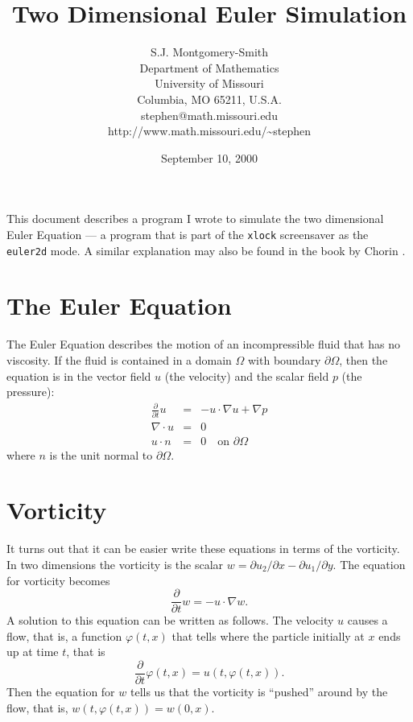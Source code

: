 \documentclass[12pt]{article}
\begin{document}
\title{Two Dimensional Euler Simulation}

\author{
S.J. Montgomery-Smith\\
Department of Mathematics\\
University of Missouri\\
Columbia, MO 65211, U.S.A.\\
stephen@math.missouri.edu\\
http://www.math.missouri.edu/\~{}stephen}

\date{September 10, 2000}

\maketitle

This document describes a program I wrote to simulate the
two dimensional Euler Equation --- a program that is part
of the {\tt xlock} screensaver as the {\tt euler2d}
mode.  A similar explanation may also be found in the
book by Chorin \cite{C}.

\section{The Euler Equation}

The Euler Equation describes the motion of an incompressible
fluid that has no viscosity.  If the fluid is contained
in a domain $\Omega$ with boundary $\partial \Omega$, then
the equation is in the vector field $u$ (the velocity)
and the
scalar field $p$ (the pressure):
\begin{eqnarray*}
\frac{\partial}{\partial t} u &=& -u \cdot \nabla u + \nabla p \\
\nabla \cdot u &=& 0 \\
u \cdot n &=& 0 \quad \text{on $\partial \Omega$}
\end{eqnarray*}
where $n$ is the unit normal to $\partial \Omega$.

\section{Vorticity}

It turns out that it can be easier write these equations
in terms of the vorticity.  In two dimensions the vorticity
is the scalar $w = \partial u_2/\partial x - \partial u_1/\partial y$.
The equation for vorticity becomes
\[ \frac{\partial}{\partial t} w = -u \cdot \nabla w .\]
A solution to this equation can be written as follows.  The velocity
$u$ causes a flow, that is, a function $\varphi(t,x)$ that tells where
the particle initially at $x$ ends up at time $t$, that is
\[
\frac\partial{\partial t} \varphi(t,x)
= u(t,\varphi(t,x)) .\]
Then the equation
for $w$ tells us that the vorticity is ``pushed'' around by the flow,
that is, $w(t,\varphi(t,x)) = w(0,x)$.
\end{document}
